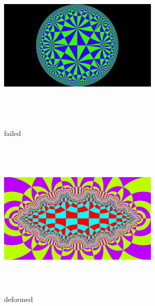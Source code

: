 \begin{figure}[htbp]
  \begin{minipage}{0.49\hsize}
   \center
   \includegraphics[width=3in, height=3in, keepaspectratio]{../img/tessellation/failed.pdf}
   \caption{failed}
   \label{fig:failed}
  \end{minipage}
 \hspace*{\fill}
 \begin{minipage}{0.49\hsize}
  \center
  \includegraphics[width=3in, height=3in, keepaspectratio]{../img/tessellation/deformed.pdf}
  \caption{deformed}
  \label{fig:deformed}
 \end{minipage}
\end{figure}

\clearpage